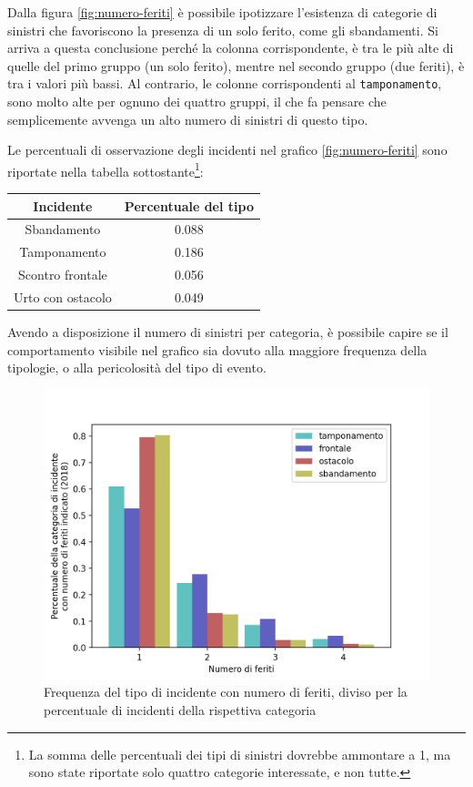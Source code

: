 \documentclass[a4paper]{report}
\newcommand{\columnstyle}[1]{\texttt{#1}}
\begin{document}
Dalla figura \ref{fig:numero-feriti} è possibile ipotizzare l'esistenza di categorie 
di sinistri che favoriscono la presenza di un solo ferito, come gli sbandamenti. 
Si arriva a questa conclusione perché la colonna corrispondente, è tra 
le più alte di quelle del primo gruppo (un solo ferito), 
mentre nel secondo gruppo (due feriti), è tra i valori più bassi. 
Al contrario, le colonne corrispondenti al \columnstyle{tamponamento}, sono molto alte 
per ognuno dei quattro gruppi, il che fa pensare che semplicemente avvenga un alto numero 
di sinistri di questo tipo. 

Le percentuali di osservazione degli incidenti nel grafico \ref{fig:numero-feriti} sono 
riportate nella tabella sottostante\footnote{La somma delle percentuali dei tipi di 
sinistri dovrebbe ammontare a 1, ma sono state riportate solo quattro categorie 
interessate, e non tutte.}: 

\begin{center}
    \def\arraystretch{1.5}%
    \begin{tabular}{ |c|c| } 
    \hline
    Incidente & Percentuale del tipo \\ 
    \hline
    \rowcolor{TableGray}
    Sbandamento       & 0.088 \\
    Tamponamento      & 0.186 \\
    \rowcolor{TableGray}
    Scontro frontale  & 0.056 \\
    Urto con ostacolo & 0.049 \\
    \hline
    \end{tabular}
\end{center}

Avendo a disposizione il numero di sinistri per categoria, è possibile capire 
se il comportamento visibile nel grafico sia dovuto alla maggiore frequenza della tipologie, 
o alla pericolosità del tipo di evento. 

\begin{figure}
    \includegraphics[width=\linewidth]{../src/incidenti/incidenti_senza_coords/natura_incidente/perc_natura_incidente.png}
    \caption{Frequenza del tipo di incidente con numero di feriti, 
    diviso per la percentuale di incidenti della rispettiva categoria}
    \label{fig:perc-numero-feriti}
\end{figure}
\end{document}
